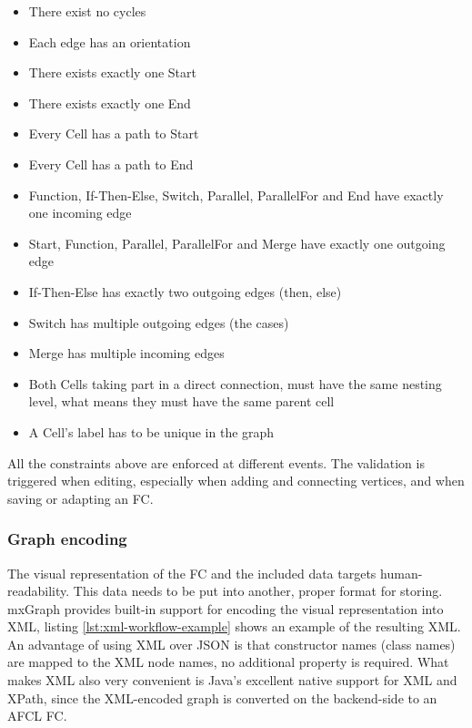 \documentclass[a4paper,top=25mm,bottom=25mm,12pt,pdftex,halfparskip,twoside,openany,bibtotoc,numbers=noenddot]{scrbook}
\begin{document}
\begin{itemize}
    \item There exist no cycles
    \item Each edge has an orientation
	\item There exists exactly one \textsf{Start}
	\item There exists exactly one \textsf{End}
    \item Every \textsf{Cell} has a path to \textsf{Start}
    \item Every \textsf{Cell} has a path to \textsf{End}
	\item \textsf{Function}, \textsf{If-Then-Else}, \textsf{Switch}, \textsf{Parallel}, \textsf{ParallelFor} and \textsf{End} have exactly one incoming edge
	\item \textsf{Start}, \textsf{Function}, \textsf{Parallel}, \textsf{ParallelFor} and \textsf{Merge} have exactly one outgoing edge
	\item \textsf{If-Then-Else} has exactly two outgoing edges (then, else)
	\item \textsf{Switch} has multiple outgoing edges (the cases)
	\item \textsf{Merge} has multiple incoming edges
	\item Both \textsf{Cell}s taking part in a direct connection, must have the same nesting level, what means they must have the same parent cell
	\item A \textsf{Cell}'s label has to be unique in the graph
\end{itemize}

All the constraints above are enforced at different events. The validation is triggered when editing, especially when adding and connecting vertices, and when saving or adapting an FC.


\subsubsection{Graph encoding}

The visual representation of the FC and the included data targets human-readability. This data needs to be put into another, proper format for storing. mxGraph provides built-in support for encoding the visual representation into XML, listing \ref{lst:xml-workflow-example} shows an example of the resulting XML. An advantage of using XML over JSON is that constructor names (class names) are mapped to the XML node names, no additional property is required.
What makes XML also very convenient is Java's excellent native support for XML and XPath, since the XML-encoded graph is converted on the backend-side to an AFCL FC.
\end{document}

